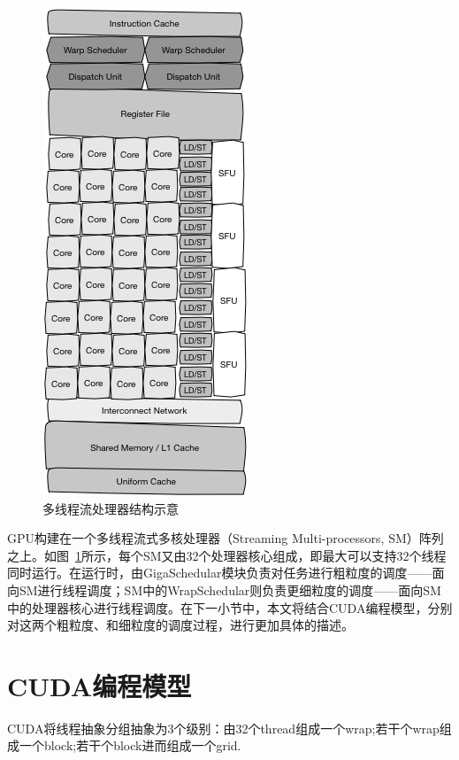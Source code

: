 \documentclass[11pt,twocolumn]{article}
\begin{document}
\begin{figure}
  \centering
    \includegraphics[scale=0.36]{images/sm-layout.png}
  \caption{多线程流处理器结构示意}
  \label{fig:sm-layout}
\end{figure}
GPU构建在一个多线程流式多核处理器（Streaming Multi-processors, SM）阵列之上。如图~\ref{fig:sm-layout}所示，每个SM又由32个处理器核心组成，即最大可以支持32个线程同时运行。在运行时，由GigaSchedular模块负责对任务进行粗粒度的调度——面向SM进行线程调度；SM中的WrapSchedular则负责更细粒度的调度——面向SM中的处理器核心进行线程调度。在下一小节中，本文将结合CUDA编程模型，分别对这两个粗粒度、和细粒度的调度过程，进行更加具体的描述。

\section{CUDA编程模型}
CUDA将线程抽象分组抽象为3个级别：由32个thread组成一个wrap;若干个wrap组成一个block;若干个block进而组成一个grid.
\end{document}
